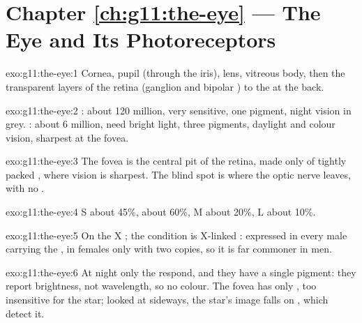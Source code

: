 \section*{Chapter \ref{ch:g11:the-eye} --- The Eye and Its Photoreceptors}

\begin{solution}{exo:g11:the-eye:1}
Cornea, pupil (through the iris), lens, vitreous body, then the
transparent layers of the retina (ganglion and bipolar ) to the
 at the back.
\end{solution}

\begin{solution}{exo:g11:the-eye:2}
: about 120 million, very sensitive, one pigment, night vision in
grey. : about 6 million, need bright light, three pigments,
daylight and colour vision, sharpest at the fovea.
\end{solution}

\begin{solution}{exo:g11:the-eye:3}
The fovea is the central pit of the retina, made only of tightly
packed , where vision is sharpest. The blind spot is where the
optic nerve leaves, with no .
\end{solution}

\begin{solution}{exo:g11:the-eye:4}
S  about 45\%,  about 60\%, M  about 20\%, L  about
10\%.
\end{solution}

\begin{solution}{exo:g11:the-eye:5}
On the X ; the condition is X-linked : expressed in
every male carrying the , in females only with two copies, so
it is far commoner in men.
\end{solution}

\begin{solution}{exo:g11:the-eye:6}
At night only the  respond, and they have a single pigment: they
report brightness, not wavelength, so no colour. The fovea has only
, too insensitive for the star; looked at sideways, the star's
image falls on , which detect it.
\end{solution}

